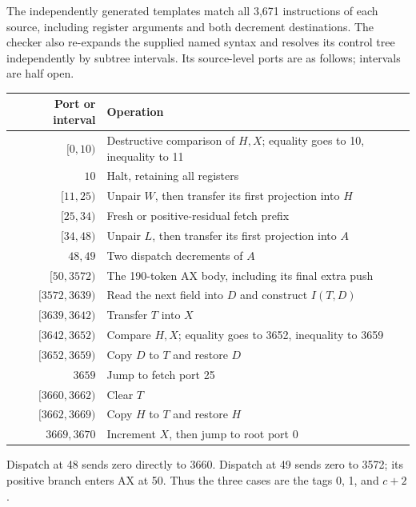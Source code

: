 The independently generated templates match all 3,671 instructions of
each source, including register arguments and both decrement destinations.
The checker also re-expands the supplied named syntax and resolves its
control tree independently by subtree intervals.  Its source-level ports
are as follows; intervals are half open.
\begin{center}
\begin{tabular}{rl}
\toprule
Port or interval&Operation\\
\midrule
$[0,10)$&Destructive comparison of $H,X$; equality goes to 10, inequality to 11\\
$10$&Halt, retaining all registers\\
$[11,25)$&Unpair $W$, then transfer its first projection into $H$\\
$[25,34)$&Fresh or positive-residual fetch prefix\\
$[34,48)$&Unpair $L$, then transfer its first projection into $A$\\
$48,49$&Two dispatch decrements of $A$\\
$[50,3572)$&The 190-token AX body, including its final extra push\\
$[3572,3639)$&Read the next field into $D$ and construct $I(T,D)$\\
$[3639,3642)$&Transfer $T$ into $X$\\
$[3642,3652)$&Compare $H,X$; equality goes to 3652, inequality to 3659\\
$[3652,3659)$&Copy $D$ to $T$ and restore $D$\\
$3659$&Jump to fetch port 25\\
$[3660,3662)$&Clear $T$\\
$[3662,3669)$&Copy $H$ to $T$ and restore $H$\\
$3669,3670$&Increment $X$, then jump to root port 0\\
\bottomrule
\end{tabular}
\end{center}
Dispatch at 48 sends zero directly to 3660.  Dispatch at 49 sends zero
to 3572; its positive branch enters AX at 50.  Thus the three cases are
the tags 0, 1, and $c+2$.

